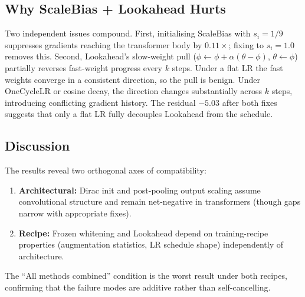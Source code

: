 \subsection{Why ScaleBias + Lookahead Hurts}

Two independent issues compound.
First, initialising ScaleBias with $s_i{=}1/9$ suppresses gradients reaching the transformer body by $0.11\times$; fixing to $s_i{=}1.0$ removes this.
Second, Lookahead's slow-weight pull ($\phi\gets\phi+\alpha(\theta-\phi)$, $\theta\gets\phi$) partially reverses fast-weight progress every $k$ steps.
Under a flat LR the fast weights converge in a consistent direction, so the pull is benign.
Under OneCycleLR or cosine decay, the direction changes substantially across $k$ steps, introducing conflicting gradient history.
The residual $-5.03$\pp{} after both fixes suggests that only a flat LR fully decouples Lookahead from the schedule.

\subsection{Discussion}

The results reveal two orthogonal axes of compatibility:
\begin{enumerate}[leftmargin=*,topsep=2pt,itemsep=1pt]
    \item \textbf{Architectural:} Dirac init and post-pooling output scaling assume convolutional structure and remain net-negative in transformers (though gaps narrow with appropriate fixes).
    \item \textbf{Recipe:} Frozen whitening and Lookahead depend on training-recipe properties (augmentation statistics, LR schedule shape) independently of architecture.
\end{enumerate}
The ``All methods combined'' condition is the worst result under both recipes, confirming that the failure modes are additive rather than self-cancelling.
